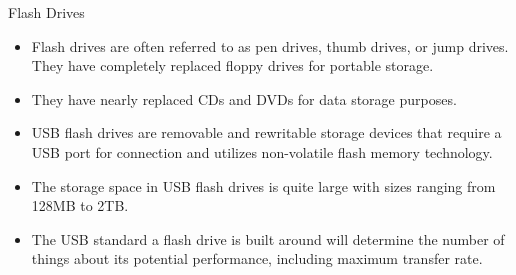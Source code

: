 \documentclass[aspectratio=169, xcolor=dvipsnames]{beamer}
\begin{document}
\begin{frame}{Flash Drives}
    \begin{block}{}
        \begin{itemize}[<+->]
            \item Flash drives are often referred to as pen drives, thumb drives, or jump drives. They have completely replaced floppy drives for portable storage.
            \item They have nearly replaced CDs and DVDs for data storage purposes.
            \item USB flash drives are removable and rewritable storage devices that require a USB port for connection and utilizes non-volatile flash memory technology.
            \item The storage space in USB flash drives is quite large with sizes ranging from 128MB to 2TB.
            \item The USB standard a flash drive is built around will determine the number of things about its potential performance, including maximum transfer rate.
        \end{itemize}
    \end{block}
\end{frame}
\end{document}
